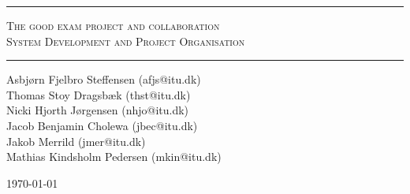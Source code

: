 \begin{titlepage}

\begin{center}

\topskip 7cm





\rule{\linewidth}{0.6mm}

\vspace{2mm}

\textsc{\LARGE The good exam project and collaboration} \\
\textsc{System Development and Project Organisation}
\vspace{1cm}
\rule{\linewidth}{0.4mm}

Asbj\o rn Fjelbro Steffensen (afjs@itu.dk)\\ Thomas Stoy Dragsb\ae k (thst@itu.dk)\\ Nicki Hjorth J\o rgensen (nhjo@itu.dk)\\ Jacob Benjamin Cholewa (jbec@itu.dk)\\ Jakob Merrild (jmer@itu.dk)\\ Mathias Kindsholm Pedersen (mkin@itu.dk)




\vfill

\large \today
\end{center}


\end{titlepage}